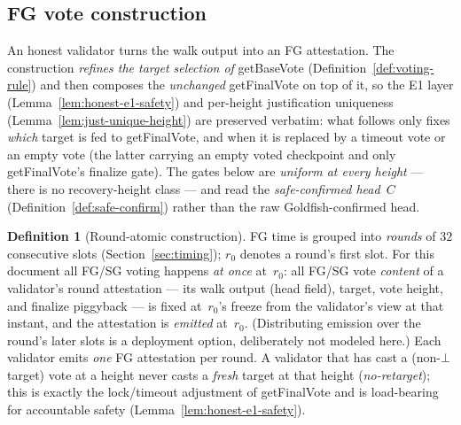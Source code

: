 \ifx\litemode\undefined\documentclass{article}\fi
\newcommand{\getBaseVote}{\textsf{getBaseVote}\xspace}
\newcommand{\getFinalVote}{\textsf{getFinalVote}\xspace}
\newcommand{\rzero}{\ensuremath{r_{0}}}                 %
\theoremstyle{plain}
\theoremstyle{definition}
\newtheorem{definition}{Definition}
\theoremstyle{remark}
\begin{document}
\subsection{FG vote construction}\label{sec:voteconstruction}

An honest validator turns the walk output into an FG attestation.  The
construction \emph{refines the target selection of} \getBaseVote
(Definition~\ref{def:voting-rule}) and then composes the \emph{unchanged}
\getFinalVote{} on top of it, so the E1 layer
(Lemma~\ref{lem:honest-e1-safety}) and per-height justification uniqueness
(Lemma~\ref{lem:just-unique-height}) are preserved verbatim: what follows
only fixes \emph{which} target is fed to \getFinalVote, and when it is
replaced by a timeout vote or an empty vote (the latter carrying an empty
voted checkpoint and only \getFinalVote{}'s finalize gate).  The gates below
are \emph{uniform at every height} --- there is no recovery-height class ---
and read the \emph{safe-confirmed head}~$C$ (Definition~\ref{def:safe-confirm})
rather than the raw Goldfish-confirmed head.

\begin{definition}[Round-atomic construction]\label{def:round-atomic}
FG time is grouped into \emph{rounds} of $32$ consecutive slots
(Section~\ref{sec:timing}); $\rzero$ denotes a round's first slot.  For this
document all FG/SG voting happens \emph{at once} at~$\rzero$: all
FG/SG vote \emph{content} of a validator's round attestation --- its walk
output (head field), target, vote height, and finalize piggyback --- is
fixed at~$\rzero$'s freeze from the validator's view at that instant, and the
attestation is \emph{emitted} at~$\rzero$.  (Distributing emission over the
round's later slots is a deployment option, deliberately not modeled here.)
Each validator emits \emph{one} FG attestation per round.  A validator that has
cast a (non-$\bot$ target) vote at a height never casts a \emph{fresh} target
at that height (\emph{no-retarget}); this is exactly the lock/timeout
adjustment of \getFinalVote{} and is load-bearing for accountable safety
(Lemma~\ref{lem:honest-e1-safety}).
\end{definition}
\end{document}
